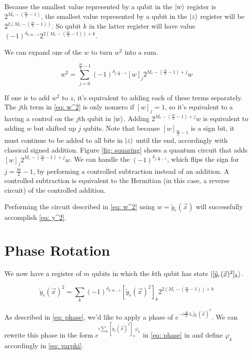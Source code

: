 Because the smallest value represented by a qubit in the $\ket{w}$ register is $2^{M_r - (\frac{m}{2} - 1)}$, the smallest value represented by a qubit in the $\ket{z}$ register will be $2^{2(M_r - (\frac{m}{2} - 1))}$. So qubit $k$ in the latter register will have value $(-1)^{\delta_{k, m - 1}}2^{2(M_r - (\frac{m}{2} - 1)) + k}$.

We can expand one of the $w$ to turn $w^2$ into a sum.

\begin{equation}
    w^2 = \sum_{j = 0}^{\frac{m}{2} - 1} (-1)^{\delta_{j, \frac{m}{2} - 1}}[w]_j2^{M_r - (\frac{m}{2} - 1) + j}w \label{eq: w^2}
\end{equation}

If one is to add $w^2$ to $z$, it's equivalent to adding each of these terms separately. The $j$th term in \eqref{eq: w^2} is only nonzero if $[w]_j = 1$, so it's equivalent to a having a control on the $j$th qubit in $\ket{w}$. Adding $2^{M_r - (\frac{m}{2} - 1) + j}w$ is equivalent to adding $w$ but shifted up $j$ qubits. Note that because $[w]_{\frac{m}{2} - 1}$ is a sign bit, it must continue to be added to all bits in $\ket{z}$ until the end, accordingly with classical signed addition. Figure \ref{fig: squaring} shows a quantum circuit that adds $[w]_j2^{M_r - (\frac{m}{2} - 1) + j}w$.
We can handle the $(-1)^{\delta_{j, \frac{m}{2} - 1}}$, which flips the sign for $j = \frac{m}{2} - 1$, by performing a controlled subtraction instead of an addition. A controlled subtraction is equivalent to the Hermitian (in this case, a reverse circuit) of the controlled addition.

Performing the circuit described in \eqref{eq: w^2} using $w = \tilde{y}_r(\vec{x})$ will successfully accomplish \eqref{eq: y^2}.

\section{Phase Rotation}

We now have a register of $m$ qubits in which the $k$th qubit has state $\ket{[\tilde{y}_r(\vec{x})^2]_k}$.

\begin{equation}
    \tilde{y}_r(\vec{x})^2 = \sum_k (-1)^{\delta_{k, m - 1}}[\tilde{y}_r(\vec{x})^2]_k2^{2(M_r - (\frac{m}{2} - 1)) + k}
\end{equation}

As described in \eqref{eq: phase}, we'd like to apply a phase of $e^{-i\frac{\Delta t}{2}\lambda_r\tilde{y}_r(\vec{x})^2}$. We can rewrite this phase in the form $e^{i\sum_k [\tilde{y}_r(\vec{x})^2]_k\varphi_k}$ in \eqref{eq: phase} in  and define $\varphi_k$ accordingly in \eqref{eq: varphi}.


